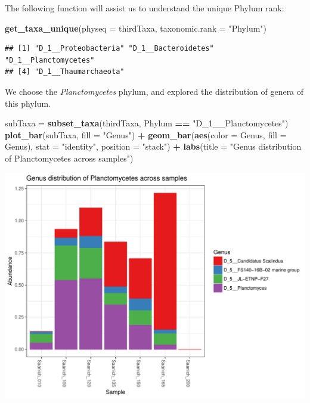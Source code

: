 \documentclass[11 pt,]{article}
\newenvironment{Shaded}{\begin{snugshade}}{\end{snugshade}}
\newcommand{\KeywordTok}[1]{\textcolor[rgb]{0.13,0.29,0.53}{\textbf{#1}}}
\newcommand{\DataTypeTok}[1]{\textcolor[rgb]{0.13,0.29,0.53}{#1}}
\newcommand{\StringTok}[1]{\textcolor[rgb]{0.31,0.60,0.02}{#1}}
\newcommand{\OperatorTok}[1]{\textcolor[rgb]{0.81,0.36,0.00}{\textbf{#1}}}
\newcommand{\NormalTok}[1]{#1}
\begin{document}
The following function will assist us to understand the unique Phylum
rank:

\begin{Shaded}
\begin{Highlighting}[]
\KeywordTok{get_taxa_unique}\NormalTok{(}\DataTypeTok{physeq =}\NormalTok{ thirdTaxa, }\DataTypeTok{taxonomic.rank =} \StringTok{"Phylum"}\NormalTok{)}
\end{Highlighting}
\end{Shaded}

\begin{verbatim}
## [1] "D_1__Proteobacteria" "D_1__Bacteroidetes"  "D_1__Planctomycetes"
## [4] "D_1__Thaumarchaeota"
\end{verbatim}

We choose the \emph{Planctomycetes} phylum, and explored the
distribution of genera of this phylum.

\begin{Shaded}
\begin{Highlighting}[]
\NormalTok{subTaxa =}\StringTok{ }\KeywordTok{subset_taxa}\NormalTok{(thirdTaxa, Phylum }\OperatorTok{==}\StringTok{ "D_1__Planctomycetes"}\NormalTok{)}
\KeywordTok{plot_bar}\NormalTok{(subTaxa, }\DataTypeTok{fill =} \StringTok{"Genus"}\NormalTok{) }\OperatorTok{+}\StringTok{ }\KeywordTok{geom_bar}\NormalTok{(}\KeywordTok{aes}\NormalTok{(}\DataTypeTok{color =}\NormalTok{ Genus, }\DataTypeTok{fill =}\NormalTok{ Genus), }
    \DataTypeTok{stat =} \StringTok{"identity"}\NormalTok{, }\DataTypeTok{position =} \StringTok{"stack"}\NormalTok{) }\OperatorTok{+}\StringTok{ }\KeywordTok{labs}\NormalTok{(}\DataTypeTok{title =} \StringTok{"Genus distribution of Planctomycetes across samples"}\NormalTok{)}
\end{Highlighting}
\end{Shaded}

\includegraphics{Figs/unnamed-chunk-9-1.pdf}
\end{document}
